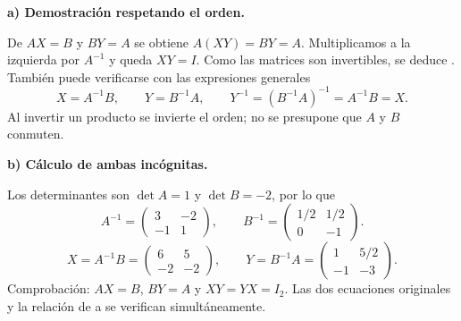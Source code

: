 \textbf{a) Demostración respetando el orden.}\par\nopagebreak[4]
De $AX=B$ y $BY=A$ se obtiene $A(XY)=BY=A$. Multiplicamos a la izquierda por $A^{-1}$ y queda $XY=I$. Como las matrices son invertibles, se deduce .
También puede verificarse con las expresiones generales
\[
X=A^{-1}B,\qquad Y=B^{-1}A,\qquad
Y^{-1}=(B^{-1}A)^{-1}=A^{-1}B=X.
\]
Al invertir un producto se invierte el orden; no se presupone que $A$ y $B$ conmuten.

\textbf{b) Cálculo de ambas incógnitas.}\par\nopagebreak[4]
Los determinantes son $\det A=1$ y $\det B=-2$, por lo que
\[
A^{-1}=\begin{pmatrix}3&-2\\-1&1\end{pmatrix},\qquad
B^{-1}=\begin{pmatrix}1/2&1/2\\0&-1\end{pmatrix}.
\]
\[
\boxed{X=A^{-1}B=\begin{pmatrix}6&5\\-2&-2\end{pmatrix}},\qquad
\boxed{Y=B^{-1}A=\begin{pmatrix}1&5/2\\-1&-3\end{pmatrix}}.
\]
Comprobación: $AX=B$, $BY=A$ y $XY=YX=I_2$. Las dos ecuaciones originales y la relación de a se verifican simultáneamente.
